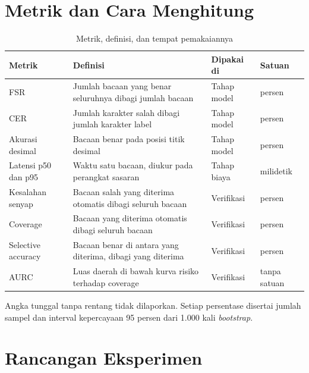 \documentclass[12pt,a4paper,oneside]{report}
\begin{document}
\chapter{Metrik dan Cara Menghitung}

\begin{table}[H]
\caption{Metrik, definisi, dan tempat pemakaiannya}
\label{tab:metrik}
\begin{tabularx}{\textwidth}{@{}L{2.6cm} L{6.2cm} L{3.0cm} X@{}}
\toprule
\textbf{Metrik} & \textbf{Definisi} & \textbf{Dipakai di} & \textbf{Satuan} \\
\midrule
FSR & Jumlah bacaan yang benar seluruhnya dibagi jumlah bacaan & Tahap model & persen \\
CER & Jumlah karakter salah dibagi jumlah karakter label & Tahap model & persen \\
Akurasi desimal & Bacaan benar pada posisi titik desimal & Tahap model & persen \\
Latensi p50 dan p95 & Waktu satu bacaan, diukur pada perangkat sasaran & Tahap biaya & milidetik \\
Kesalahan senyap & Bacaan salah yang diterima otomatis dibagi seluruh bacaan & Verifikasi & persen \\
Coverage & Bacaan yang diterima otomatis dibagi seluruh bacaan & Verifikasi & persen \\
Selective accuracy & Bacaan benar di antara yang diterima, dibagi yang diterima & Verifikasi & persen \\
AURC & Luas daerah di bawah kurva risiko terhadap coverage & Verifikasi & tanpa satuan \\
\bottomrule
\end{tabularx}
\end{table}

Angka tunggal tanpa rentang tidak dilaporkan. Setiap persentase disertai jumlah
sampel dan interval kepercayaan 95 persen dari 1.000 kali \textit{bootstrap}.

\chapter{Rancangan Eksperimen}
\end{document}
